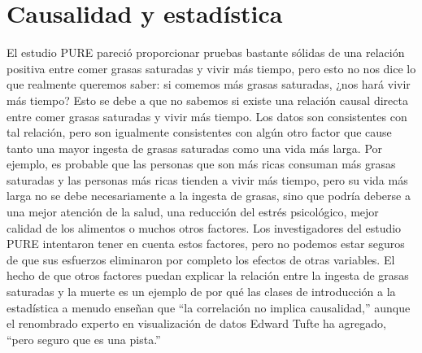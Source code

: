 \documentclass[
  12pt,
]{book}
\begin{document}
\hypertarget{causalidad-y-estaduxedstica}{%
\section{Causalidad y estadística}\label{causalidad-y-estaduxedstica}}

El estudio PURE pareció proporcionar pruebas bastante sólidas de una relación positiva entre comer grasas saturadas y vivir más tiempo, pero esto no nos dice lo que realmente queremos saber: si comemos más grasas saturadas, ¿nos hará vivir más tiempo? Esto se debe a que no sabemos si existe una relación causal directa entre comer grasas saturadas y vivir más tiempo. Los datos son consistentes con tal relación, pero son igualmente consistentes con algún otro factor que cause tanto una mayor ingesta de grasas saturadas como una vida más larga. Por ejemplo, es probable que las personas que son más ricas consuman más grasas saturadas y las personas más ricas tienden a vivir más tiempo, pero su vida más larga no se debe necesariamente a la ingesta de grasas, sino que podría deberse a una mejor atención de la salud, una reducción del estrés psicológico, mejor calidad de los alimentos o muchos otros factores. Los investigadores del estudio PURE intentaron tener en cuenta estos factores, pero no podemos estar seguros de que sus esfuerzos eliminaron por completo los efectos de otras variables. El hecho de que otros factores puedan explicar la relación entre la ingesta de grasas saturadas y la muerte es un ejemplo de por qué las clases de introducción a la estadística a menudo enseñan que ``la correlación no implica causalidad,'' aunque el renombrado experto en visualización de datos Edward Tufte ha agregado, ``pero seguro que es una pista.''
\end{document}
